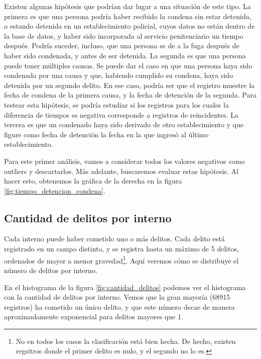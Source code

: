 \documentclass[10pt]{article}
\begin{document}
Existen algunas hipótesis que podrían dar lugar a una situación de este tipo. La primera es que una persona podría haber recibido la condena sin estar detenida, o estando detenida en un establecimiento policial, cuyos datos no están dentro de la base de datos, y haber sido incorporada al servicio penitenciario un tiempo después. Podría suceder, incluso, que una persona se de a la fuga después de haber sido condenada, y antes de ser detenida. La segunda es que una persona puede tener múltiples causas. Se puede dar el caso en que una persona haya sido condenada por una causa y que, habiendo cumplido su condena, haya sido detenida por un segundo delito. En ese caso, podría ser que el registro muestre la fecha de condena de la primera causa, y la fecha de detención de la segunda. Para testear esta hipótesis, se podría estudiar si los registros para los cuales la diferencia de tiempos es negativa corresponde a registros de reincidentes. La tercera es que un condenado haya sido derivado de otro establecimiento y que figure como fecha de detención la fecha en la que ingresó al último establecimiento.

Para este primer análisis, vamos a considerar todos los valores negativos como outliers y descartarlos. Más adelante, buscaremos evaluar estas hipótesis. Al hacer esto, obtenemos la gr\'afica de la derecha en la figura \ref{fig:tiempo_detencion_condena}.


\subsection{Cantidad de delitos por interno}

Cada interno puede haber cometido uno o más delitos. Cada delito está registrado en un campo distinto, y se registra hasta un máximo de 5 delitos, ordenados de mayor a menor gravedad\footnote{No en todos los casos la clasificaci\'on est\'a bien hecha. De hecho, existen regsitros donde el primer delito es nulo, y el segundo no lo es.}. Aquí veremos cómo se distribuye el número de delitos por interno.

En el histograma de la figura \ref{fig:cantidad_delitos} podemos ver el histograma con la cantidad de delitos por interno. Vemos que la gran mayor\'ia (68915 registros) ha cometido un \'unico delito, y que este n\'umero decae de manera aproximadamente exponencial para delitos mayores que 1.  
\end{document}
